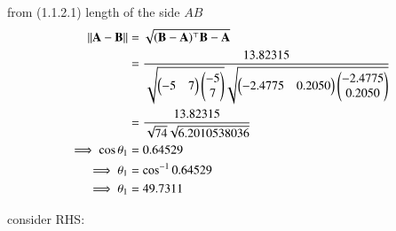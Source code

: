 \documentclass[journal,12pt,twocolumn]{IEEEtran}
\theoremstyle{remark}
\begin{document}
from (1.1.2.1) length of the side $AB$
\begin{align}
\left\lVert\mathbf{A} - \mathbf{B}\right\rVert &= \sqrt{(\mathbf{B}-\mathbf{A}){^\top}\mathbf{B}-\mathbf{A}}\\
&= \frac{13.82315}{\sqrt{\begin{pmatrix}-5& 7\end{pmatrix}\begin{pmatrix}-5\\7\end{pmatrix}}\sqrt{\begin{pmatrix}-2.4775&0.2050\end{pmatrix}\begin{pmatrix}-2.4775\\0.2050\end{pmatrix}}}\\
&= \frac{13.82315}{\sqrt{74}\sqrt{6.2010538036}}\\
\implies \cos{\theta_1} &= 0.64529 \\
\implies \theta_1 &= \cos^{-1}{0.64529}\\
\implies \theta_1 &= 49.7311 \label{eq:angle BAI}
\end{align}

consider RHS:
\end{document}
